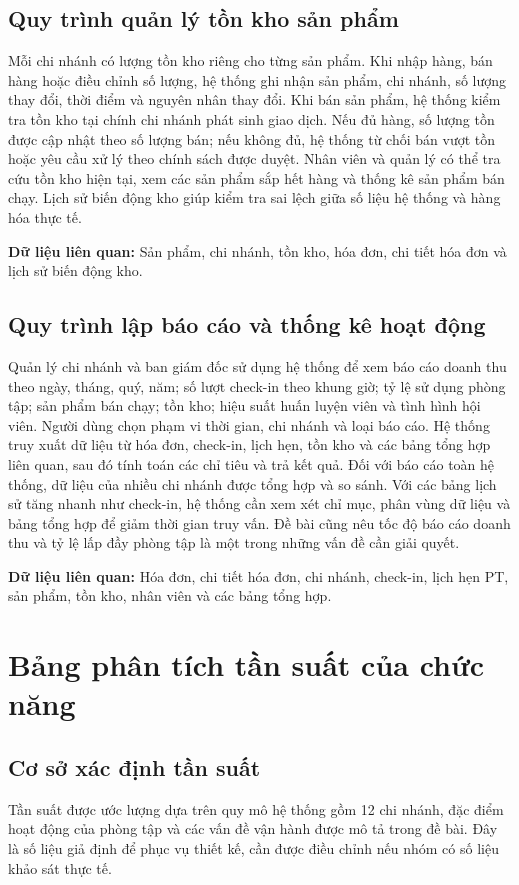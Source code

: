 \documentclass[11pt, a4paper]{article}
\begin{document}
\subsection{Quy trình quản lý tồn kho sản phẩm}
Mỗi chi nhánh có lượng tồn kho riêng cho từng sản phẩm. Khi nhập hàng, bán hàng hoặc điều chỉnh số lượng, hệ thống ghi nhận sản phẩm, chi nhánh, số lượng thay đổi, thời điểm và nguyên nhân thay đổi. Khi bán sản phẩm, hệ thống kiểm tra tồn kho tại chính chi nhánh phát sinh giao dịch. Nếu đủ hàng, số lượng tồn được cập nhật theo số lượng bán; nếu không đủ, hệ thống từ chối bán vượt tồn hoặc yêu cầu xử lý theo chính sách được duyệt. Nhân viên và quản lý có thể tra cứu tồn kho hiện tại, xem các sản phẩm sắp hết hàng và thống kê sản phẩm bán chạy. Lịch sử biến động kho giúp kiểm tra sai lệch giữa số liệu hệ thống và hàng hóa thực tế.

\textbf{Dữ liệu liên quan:} Sản phẩm, chi nhánh, tồn kho, hóa đơn, chi tiết hóa đơn và lịch sử biến động kho.

\subsection{Quy trình lập báo cáo và thống kê hoạt động}
Quản lý chi nhánh và ban giám đốc sử dụng hệ thống để xem báo cáo doanh thu theo ngày, tháng, quý, năm; số lượt check-in theo khung giờ; tỷ lệ sử dụng phòng tập; sản phẩm bán chạy; tồn kho; hiệu suất huấn luyện viên và tình hình hội viên. Người dùng chọn phạm vi thời gian, chi nhánh và loại báo cáo. Hệ thống truy xuất dữ liệu từ hóa đơn, check-in, lịch hẹn, tồn kho và các bảng tổng hợp liên quan, sau đó tính toán các chỉ tiêu và trả kết quả. Đối với báo cáo toàn hệ thống, dữ liệu của nhiều chi nhánh được tổng hợp và so sánh. Với các bảng lịch sử tăng nhanh như check-in, hệ thống cần xem xét chỉ mục, phân vùng dữ liệu và bảng tổng hợp để giảm thời gian truy vấn. Đề bài cũng nêu tốc độ báo cáo doanh thu và tỷ lệ lấp đầy phòng tập là một trong những vấn đề cần giải quyết.

\textbf{Dữ liệu liên quan:} Hóa đơn, chi tiết hóa đơn, chi nhánh, check-in, lịch hẹn PT, sản phẩm, tồn kho, nhân viên và các bảng tổng hợp.

\newpage

\section{Bảng phân tích tần suất của chức năng}

\subsection{Cơ sở xác định tần suất}
Tần suất được ước lượng dựa trên quy mô hệ thống gồm 12 chi nhánh, đặc điểm hoạt động của phòng tập và các vấn đề vận hành được mô tả trong đề bài. Đây là số liệu giả định để phục vụ thiết kế, cần được điều chỉnh nếu nhóm có số liệu khảo sát thực tế.
\end{document}
